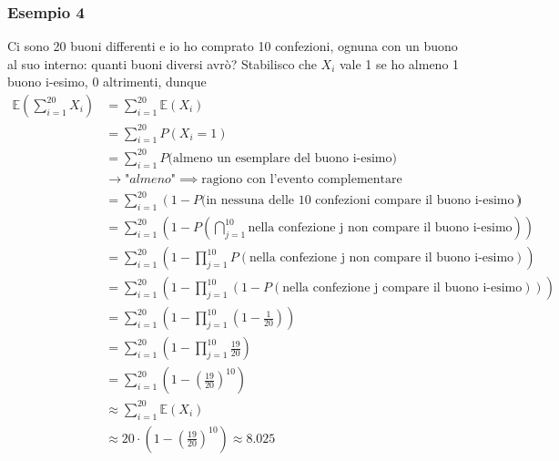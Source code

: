 \documentclass[11pt]{report}
\begin{document}
\subsubsection{Esempio 4}
Ci sono 20 buoni differenti e io ho comprato 10 confezioni, ognuna con un buono al suo interno: quanti buoni diversi avrò? Stabilisco che $X_i$ vale 1 se ho almeno 1 buono i-esimo, 0 altrimenti, dunque
\begin{equation}
    \begin{split}
        \mathbb{E} \left( \sum_{i=1}^{20} X_i \right) & = \sum_{i=1}^{20} \mathbb{E}(X_i)\\
        & = \sum_{i=1}^{20} P(X_i = 1)\\
        & = \sum_{i=1}^{20} P(\text{almeno un esemplare del buono i-esimo)}\\
        & \rightarrow \textit{"almeno"} \implies \text{ragiono con l'evento complementare}\\
        & = \sum_{i=1}^{20} (1 - P\text{(in nessuna delle 10 confezioni compare il buono i-esimo}))\\
        & = \sum_{i=1}^{20} \left(1 - P\left(\bigcap_{j=1}^{10} \text{nella confezione j non compare il buono i-esimo} \right)\right)\\
        & = \sum_{i=1}^{20} \left(1 - \prod_{j=1}^{10}P(\text{nella confezione j non compare il buono i-esimo})\right)\\
        & = \sum_{i=1}^{20} \left(1 - \prod_{j=1}^{10}(1 - P(\text{nella confezione j compare il buono i-esimo}))\right)\\
        & = \sum_{i=1}^{20} \left(1 - \prod_{j=1}^{10}\left(1 - \frac{1}{20}\right)\right)\\
        & = \sum_{i=1}^{20} \left(1 - \prod_{j=1}^{10}\frac{19}{20}\right)\\
        & = \sum_{i=1}^{20} \left(1 - \left(\frac{19}{20}\right)^{10}\right)\\
        & \approx \sum_{i=1}^{20} \mathbb{E}(X_i)\\
        & \approx 20 \cdot \left(1 - \left(\frac{19}{20}\right)^{10}\right) \approx 8.025
    \end{split}
\end{equation}
\end{document}
